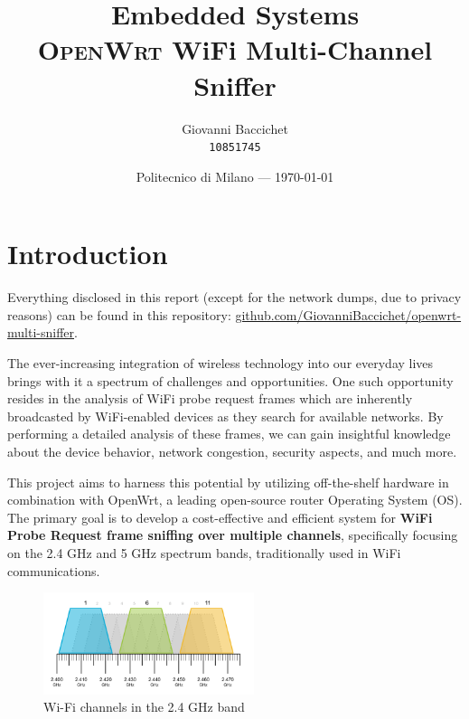 \documentclass{article}
\title{Embedded Systems \\ \textsc{OpenWrt} WiFi Multi-Channel Sniffer} %
\author{Giovanni Baccichet \\ \raisebox{0.1\height}{\fontsize{8}{8}\faUser} \texttt{10851745}} %
\date{Politecnico di Milano --- \today} %
\begin{document}
\maketitle %


\section{Introduction} %

\begin{warn}
    Everything disclosed in this report (except for the network dumps, due to privacy reasons) can be found in this repository: \href{https://github.com/GiovanniBaccichet/openwrt-multi-sniffer}{\raisebox{0.1\height}{\fontsize{8}{8}\faLink} github.com/GiovanniBaccichet/openwrt-multi-sniffer}.
\end{warn}

The ever-increasing integration of wireless technology into our everyday lives brings with it a spectrum of challenges and opportunities. One such opportunity resides in the analysis of WiFi probe request frames which are inherently broadcasted by WiFi-enabled devices as they search for available networks. By performing a detailed analysis of these frames, we can gain insightful knowledge about the device behavior, network congestion, security aspects, and much more.

This project aims to harness this potential by utilizing off-the-shelf hardware in combination with OpenWrt, a leading open-source router Operating System (OS). The primary goal is to develop a cost-effective and efficient system for \textbf{WiFi Probe Request frame sniffing over multiple channels}, specifically focusing on the 2.4 GHz and 5 GHz spectrum bands, traditionally used in WiFi communications. 

\begin{figure}[h]
    \centering
    \includegraphics[width=0.55\textwidth]{assets/2GHz-channels.png}
    \caption{Wi-Fi channels in the 2.4 GHz band}
    \label{fig:wifi-channels}
\end{figure}
\end{document}
